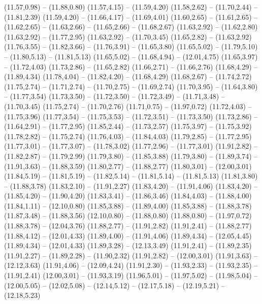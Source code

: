 {  (11.57,0.98) -- (11.88,0.80)
  (11.57,4.15) -- (11.59,4.20)
  (11.58,2.62) -- (11.70,2.44) -- (11.81,2.39)
  (11.59,4.20) -- (11.66,4.17) -- (11.69,4.01)
  (11.60,2.65) -- (11.61,2.65) -- (11.62,2.65) -- (11.63,2.66) -- (11.65,2.66) -- (11.68,2.67)
  (11.63,2.92) -- (11.62,2.80)
  (11.63,2.92) -- (11.77,2.95)
  (11.63,2.92) -- (11.70,3.45)
  (11.65,2.82) -- (11.63,2.92)
  (11.76,3.55) -- (11.82,3.66) -- (11.76,3.91) -- (11.65,3.80)
  (11.65,5.02) -- (11.79,5.10) -- (11.80,5.13) -- (11.81,5.13)
  (11.65,5.02) -- (11.68,4.94) -- (12.01,4.75)
  (11.65,3.97) -- (11.72,4.03)
  (11.73,2.86) -- (11.65,2.82)
  (11.66,2.71) -- (11.66,2.76)
  (11.68,4.29) -- (11.89,4.34)
  (11.78,4.04) -- (11.82,4.20) -- (11.68,4.29)
  (11.68,2.67) -- (11.74,2.72)
  (11.75,2.74) -- (11.71,2.74) -- (11.70,2.75) -- (11.69,2.74)
  (11.70,3.95) -- (11.64,3.80) -- (11.77,3.54)
  (11.73,3.50) -- (11.72,3.50) -- (11.72,3.49) -- (11.71,3.48) -- (11.70,3.45)
  (11.75,2.74) -- (11.70,2.76)
  (11.71,0.75) -- (11.97,0.72)
  (11.72,4.03) -- (11.75,3.96)
  (11.77,3.54) -- (11.75,3.53) -- (11.72,3.51) -- (11.73,3.50)
  (11.73,2.86) -- (11.64,2.91) -- (11.77,2.95)
  (11.85,2.44) -- (11.73,2.57)
  (11.75,3.97) -- (11.75,3.92)
  (11.78,2.82) -- (11.75,2.74)
  (11.76,4.03) -- (11.84,4.03)
  (11.79,2.85) -- (11.77,2.95)
  (11.77,3.01) -- (11.77,3.07) -- (11.78,3.02)
  (11.77,2.96) -- (11.77,3.01)
  (11.91,2.82) -- (11.82,2.87) -- (11.79,2.99)
  (11.79,3.80) -- (11.85,3.88)
  (11.79,3.80) -- (11.89,3.74) -- (11.91,3.63) -- (11.88,3.59)
  (11.80,2.77) -- (11.88,2.77)
  (11.80,3.01) -- (12.00,3.01)
  (11.84,5.19) -- (11.81,5.19) -- (11.82,5.14) -- (11.81,5.14) -- (11.81,5.13)
  (11.81,3.80) -- (11.88,3.78)
  (11.83,2.10) -- (11.91,2.27)
  (11.83,4.20) -- (11.91,4.06)
  (11.83,4.20) -- (11.85,4.20) -- (11.90,4.20)
  (11.83,3.41) -- (11.86,3.46)
  (11.84,4.03) -- (11.88,4.00)
  (11.84,1.11) -- (12.10,0.80)
  (11.85,3.88) -- (11.89,4.00)
  (11.85,3.88) -- (11.88,3.78)
  (11.87,3.48) -- (11.88,3.56)
  (12.10,0.80) -- (11.88,0.80)
  (11.88,0.80) -- (11.97,0.72)
  (11.88,3.78) -- (12.04,3.76)
  (11.88,2.77) -- (11.91,2.82)
  (11.91,2.41) -- (11.88,2.77)
  (11.88,4.12) -- (12.01,4.33)
  (11.89,4.00) -- (11.91,4.06)
  (11.89,4.34) -- (12.05,4.45)
  (11.89,4.34) -- (12.01,4.33)
  (11.89,3.28) -- (12.13,3.49)
  (11.91,2.41) -- (11.89,2.35)
  (11.91,2.27) -- (11.89,2.28) -- (11.90,2.32)
  (11.91,2.82) -- (12.00,3.01)
  (11.91,3.63) -- (12.12,3.63)
  (11.91,4.06) -- (12.09,4.24)
  (11.91,2.30) -- (11.93,2.33) -- (11.93,2.35) -- (11.91,2.41)
  (12.00,3.01) -- (11.93,3.19)
  (11.96,5.01) -- (11.97,5.02) -- (11.98,5.04) -- (12.00,5.05) -- (12.02,5.08) -- (12.14,5.12) -- (12.17,5.18) -- (12.19,5.21) -- (12.18,5.23)
}
